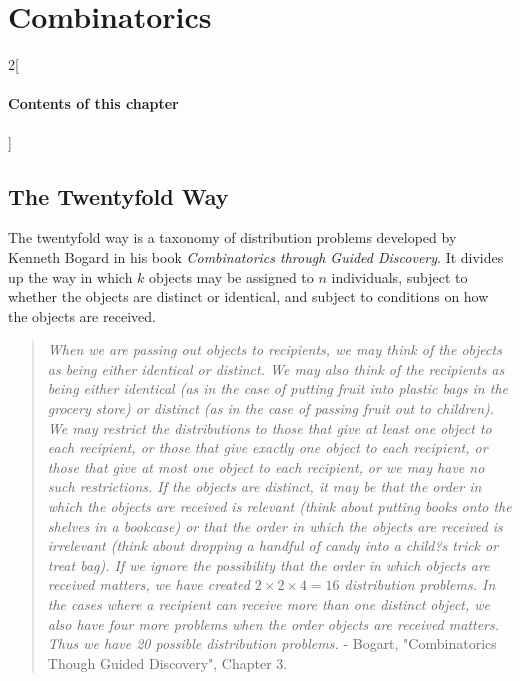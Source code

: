\chapter{Combinatorics}

\begin{multicols}{2}[\subsubsection*{Contents of this chapter}]
\end{multicols}


\section{The Twentyfold Way}

The twentyfold way is a taxonomy of distribution problems developed by Kenneth Bogard in his book \textit{Combinatorics through Guided Discovery}. It divides up the way in which $k$ objects may be assigned to $n$ individuals, subject to whether the objects are distinct or identical, and subject to conditions on how the objects are received.


\begin{quote}
\textit{When we are passing out objects to recipients, we may think of the objects as being either identical or distinct. We may also think of the recipients as being either identical (as in the case of putting fruit into plastic bags in the grocery store) or distinct (as in the case of passing fruit out to children). We may restrict the distributions to those that give at least one object to each recipient, or those that give exactly one object to each recipient, or those that give at most one object to each recipient, or we may have no such restrictions. If the objects are distinct, it may be that the order in which the objects are received is relevant (think about putting books onto the shelves in a bookcase) or that the order in which the objects are received is irrelevant (think about dropping a handful of candy into a child?s trick or treat bag). If we ignore the possibility that the order in which objects are received matters, we have created $2\times2\times4 = 16$ distribution problems. In the cases where a recipient can receive more than one distinct object, we also have four more problems when the order objects are received matters. Thus we have 20 possible distribution problems.} - Bogart, "Combinatorics Though Guided Discovery", Chapter 3.
\end{quote}


